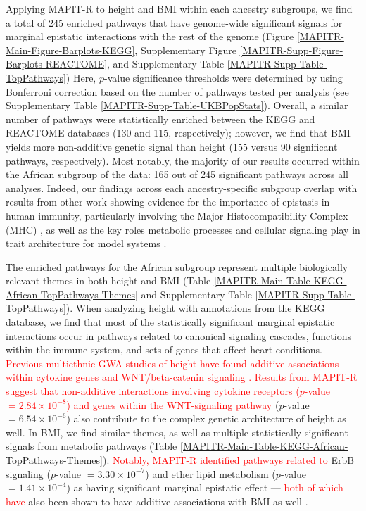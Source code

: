 \documentclass[10pt]{article}
\begin{document}
Applying MAPIT-R to height and BMI within each ancestry subgroups, we find a total of 245 enriched pathways that have genome-wide significant signals for marginal epistatic interactions with the rest of the genome (Figure \ref{MAPITR-Main-Figure-Barplots-KEGG}, Supplementary Figure \ref{MAPITR-Supp-Figure-Barplots-REACTOME}, and Supplementary Table \ref{MAPITR-Supp-Table-TopPathways}) Here, $p$-value significance thresholds were determined by using Bonferroni correction based on the number of pathways tested per analysis (see Supplementary Table \ref{MAPITR-Supp-Table-UKBPopStats}). Overall, a similar number of pathways were statistically enriched between the KEGG and REACTOME databases (130 and 115, respectively); however, we find that BMI yields more non-additive genetic signal than height (155 versus 90 significant pathways, respectively). Most notably, the majority of our results occurred within the African subgroup of the data: 165 out of 245 significant pathways across all analyses. Indeed, our findings across each ancestry-specific subgroup overlap with results from other work showing evidence for the importance of epistasis in human immunity, particularly involving the Major Histocompatibility Complex (MHC) \cite{Martin2002,Williams2005,Wan2010,Rose2012,Lareau2016,Opi2018,Zhang2019}, as well as the key roles metabolic processes and cellular signaling play in trait architecture for model systems \cite{Segre2005,Snitkin2011,Podgornaia2015,Sorrells2015,Tyler2017,Nghe2018,Jiao2019}. 

The enriched pathways for the African subgroup represent multiple biologically relevant themes in both height and BMI (Table \ref{MAPITR-Main-Table-KEGG-African-TopPathways-Themes} and Supplementary Table \ref{MAPITR-Supp-Table-TopPathways}). When analyzing height with annotations from the KEGG database, we find that most of the statistically significant marginal epistatic interactions occur in pathways related to canonical signaling cascades, functions within the immune system, and sets of genes that affect heart conditions. \textcolor{red}{Previous multiethnic GWA studies of height have found additive associations within cytokine genes \cite{Marouli2017} and WNT/beta-catenin signaling \cite{Wood2014b}. Results from MAPIT-R suggest that non-additive interactions involving cytokine receptors ($p$-value $= 2.84\times 10^{-8}$) and genes within the WNT-signaling pathway} ($p$-value $= 6.54\times 10^{-6}$) also contribute to the complex genetic architecture of height as well. In BMI, we find similar themes, as well as multiple statistically significant signals from metabolic pathways (Table \ref{MAPITR-Main-Table-KEGG-African-TopPathways-Themes}). \textcolor{red}{Notably, MAPIT-R identified pathways related to} ErbB signaling ($p$-value $= 3.30\times 10^{-7}$) and ether lipid metabolism ($p$-value $= 1.41\times 10^{-4}$) as having significant marginal epistatic effect --- \textcolor{red}{both of which have} also been shown to have additive associations with BMI as well \cite{Locke2015,Salinas2016,Jha2018}. 
\end{document}
